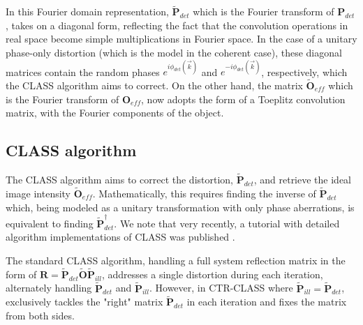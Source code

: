 \documentclass[pdflatex,sn-mathphys-num,Numbered]{sn-jnl}%
\theoremstyle{thmstyleone}%
\theoremstyle{thmstyletwo}%
\theoremstyle{thmstylethree}%
\begin{document}
In this Fourier domain representation, $\tilde{\textbf{P}}_{det}$ which is the Fourier transform of $\textbf{P}_{det}$, takes on a diagonal form, reflecting the fact that the convolution operations in real space become simple multiplications in Fourier space. In the case of a unitary phase-only distortion (which is the model in the coherent case), these diagonal matrices contain the random phases $e^{i\phi_{det}(\vec{k})}$ and $e^{-i\phi_{det}(\vec{k})}$, respectively, which the CLASS algorithm aims to correct. On the other hand, the matrix $\tilde{\textbf{O}}_{eff}$ which is the Fourier transform of $\textbf{O}_{eff}$, now adopts the form of a Toeplitz convolution matrix, with the Fourier components of the object.

\subsection*{CLASS algorithm}

The CLASS algorithm \cite{kang17} aims to correct the distortion, $\tilde{\textbf{P}}_{det}$, and retrieve the ideal image intensity ${\tilde{\textbf{O}}_{eff}}$. Mathematically, this requires finding the inverse of $\tilde{\textbf{P}}_{det}$ which, being modeled as a unitary transformation with only phase aberrations, is equivalent to finding $\tilde{\textbf{P}}_{det}^{\dagger}$.
We note that very recently, a tutorial with detailed algorithm implementations of CLASS was published \cite{kang2024implementation}. 

The standard CLASS algorithm, handling a full system reflection matrix in the form of  $\textbf{R}={\tilde{\textbf{P}}_{det}}{\tilde{\textbf{O}}}{\tilde{\textbf{P}}_{ill}}$, addresses a single distortion during each iteration, alternately handling $\tilde{\textbf{P}}_{det}$ and $\tilde{\textbf{P}}_{ill}$. However, in CTR-CLASS \cite{lee22} where $\tilde{\textbf{P}}_{ill} = \tilde{\textbf{P}}_{det}$, exclusively tackles the "right" matrix $\tilde{\textbf{P}}_{det}$ in each iteration and fixes the matrix from both sides.
\end{document}
